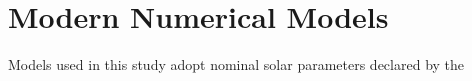 \section{Modern Numerical Models}
Models used in this study adopt nominal solar parameters declared by the 